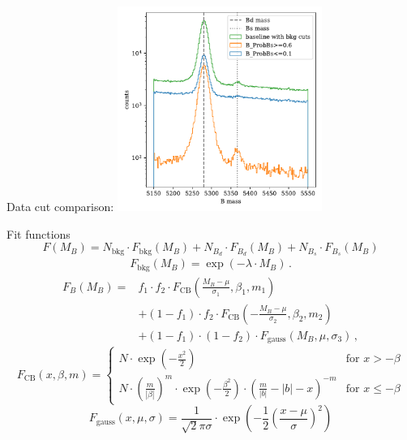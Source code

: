 \documentclass[aspectratio=1610, 10pt]{beamer}
\begin{document}
\begin{frame}{Data cut comparison:}
  \centering
  \includegraphics[width=0.5\textwidth]{images/backup/data_cut_comparison.pdf}
\end{frame}

\begin{frame}{Fit functions}
  \begin{equation*}
    F(M_B) = N_\text{bkg} \cdot F_\text{bkg}(M_B) + N_{B_d} \cdot F_{B_d}(M_B) + N_{B_s} \cdot F_{B_s}(M_B)
  \end{equation*}
  \begin{align*}
    F_\text{bkg}(M_B) = \exp(-\lambda \cdot M_B) \, .
  \end{align*}
  \begin{align*}
    F_B(M_B) = &f_1 \cdot f_2 \cdot F_\text{CB}\left(\frac{M_B-\mu}{\sigma_1}, \beta_1, m_1\right) \nonumber\\
                &+ (1-f_1) \cdot f_2 \cdot F_\text{CB}\left(-\frac{M_B-\mu}{\sigma_2}, \beta_2, m_2\right) \nonumber\\
                &+ (1-f_1) \cdot (1-f_2) \cdot F_\text{gauss}\left(M_B,\mu,\sigma_3\right) \, , \label{eqn:FB}
  \end{align*}
  \begin{equation*}
    F_\text{CB}(x,\beta,m) = 
    \begin{cases}
        N \cdot \exp(-\frac{x^2}{2}) & \text{for } x > -\beta \\
        N \cdot \left(\frac{m}{|\beta|}\right)^m \cdot \exp\left(-\frac{\beta^2}{2}\right) \cdot \left(\frac{m}{|b|}-|b| - x\right)^{-m} & \text{for } x \leq -\beta
    \end{cases}
  \end{equation*}
  \begin{equation*}
    F_\text{gauss}\left(x,\mu,\sigma\right) = \frac{1}{\sqrt{2}\pi\sigma} \cdot \exp\left(-\frac{1}{2}\left(\frac{x-\mu}{\sigma}\right)^2\right)
  \end{equation*}
\end{frame}
\end{document}
